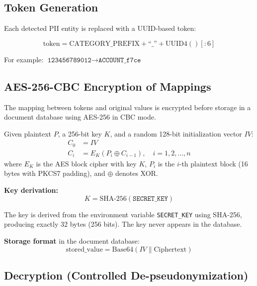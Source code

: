 \subsection{Token Generation}

Each detected PII entity is replaced with a UUID-based token:

\begin{equation}
\text{token} = \text{CATEGORY\_PREFIX} + \text{``\_''} + \text{UUID4}()[:6]
\end{equation}

For example: $\texttt{123456789012} \rightarrow \texttt{ACCOUNT\_f7ce}$

\subsection{AES-256-CBC Encryption of Mappings}

The mapping between tokens and original values is encrypted before storage in a document database using AES-256 in CBC mode.

\begin{definition}
Given plaintext $P$, a 256-bit key $K$, and a random 128-bit initialization vector $IV$:
\begin{align}
C_0 &= IV \\
C_i &= E_K(P_i \oplus C_{i-1}), \quad i = 1, 2, \ldots, n
\end{align}
where $E_K$ is the AES block cipher with key $K$, $P_i$ is the $i$-th plaintext block (16 bytes with PKCS7 padding), and $\oplus$ denotes XOR.
\end{definition}

\textbf{Key derivation:}
\begin{equation}
K = \text{SHA-256}(\texttt{SECRET\_KEY})
\end{equation}

The key is derived from the environment variable \texttt{SECRET\_KEY} using SHA-256, producing exactly 32 bytes (256 bits). The key never appears in the database.

\textbf{Storage format} in the document database:
\begin{equation}
\text{stored\_value} = \text{Base64}(IV \| \text{Ciphertext})
\end{equation}

\subsection{Decryption (Controlled De-pseudonymization)}

